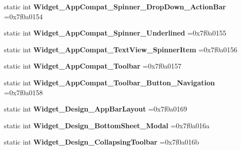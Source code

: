 \begin{DoxyCompactItemize}
static int {\bfseries Widget\+\_\+\+App\+Compat\+\_\+\+Spinner\+\_\+\+Drop\+Down\+\_\+\+Action\+Bar} =0x7f0a0154
\item 
\mbox{\label{classandroid_1_1support_1_1v7_1_1cardview_1_1R_1_1style_a6d2af5887887087946e25ee9c7c423a6}} 
static int {\bfseries Widget\+\_\+\+App\+Compat\+\_\+\+Spinner\+\_\+\+Underlined} =0x7f0a0155
\item 
\mbox{\label{classandroid_1_1support_1_1v7_1_1cardview_1_1R_1_1style_a96e87e83b6ab8477574e7f71cd7b1e7e}} 
static int {\bfseries Widget\+\_\+\+App\+Compat\+\_\+\+Text\+View\+\_\+\+Spinner\+Item} =0x7f0a0156
\item 
\mbox{\label{classandroid_1_1support_1_1v7_1_1cardview_1_1R_1_1style_a51fd9cd8b4fc840eb40c9381e4296f7d}} 
static int {\bfseries Widget\+\_\+\+App\+Compat\+\_\+\+Toolbar} =0x7f0a0157
\item 
\mbox{\label{classandroid_1_1support_1_1v7_1_1cardview_1_1R_1_1style_a246cfab3f989395635d338830488fdf4}} 
static int {\bfseries Widget\+\_\+\+App\+Compat\+\_\+\+Toolbar\+\_\+\+Button\+\_\+\+Navigation} =0x7f0a0158
\item 
\mbox{\label{classandroid_1_1support_1_1v7_1_1cardview_1_1R_1_1style_a006091d73f379eb017eb7955aab185a9}} 
static int {\bfseries Widget\+\_\+\+Design\+\_\+\+App\+Bar\+Layout} =0x7f0a0169
\item 
\mbox{\label{classandroid_1_1support_1_1v7_1_1cardview_1_1R_1_1style_a4c4013f59b38cd188599915fb2f64207}} 
static int {\bfseries Widget\+\_\+\+Design\+\_\+\+Bottom\+Sheet\+\_\+\+Modal} =0x7f0a016a
\item 
\mbox{\label{classandroid_1_1support_1_1v7_1_1cardview_1_1R_1_1style_a2496d968c5698a907a37f5137945138f}} 
static int {\bfseries Widget\+\_\+\+Design\+\_\+\+Collapsing\+Toolbar} =0x7f0a016b
\item 
\mbox{\label{classandroid_1_1support_1_1v7_1_1cardview_1_1R_1_1style_afc2419b91db543f469901773ef267625}} 

\end{DoxyCompactItemize}

